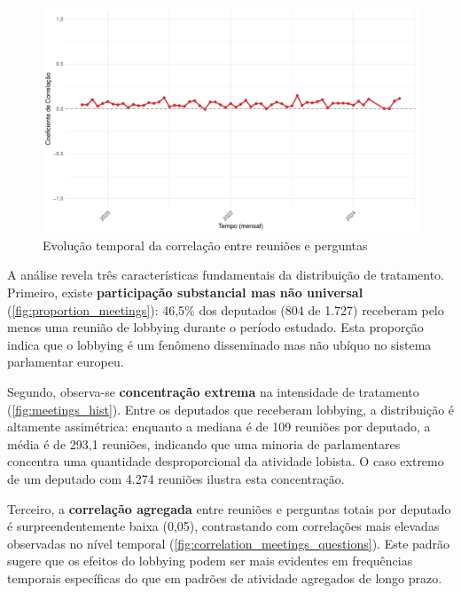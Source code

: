 \begin{figure}[htbp]
    \centering
    \includegraphics[width=\textwidth]{figures/descriptive_plots/fig3_correlation_meetings_questions.pdf}
    \caption{Evolução temporal da correlação entre reuniões e perguntas}
    \label{fig:correlation_meetings_questions}
\end{figure}


A análise revela três características fundamentais da distribuição de tratamento. Primeiro, existe \textbf{participação substancial mas não universal} (\autoref{fig:proportion_meetings}): 46,5\% dos deputados (804 de 1.727) receberam pelo menos uma reunião de lobbying durante o período estudado. Esta proporção indica que o lobbying é um fenômeno disseminado mas não ubíquo no sistema parlamentar europeu.

Segundo, observa-se \textbf{concentração extrema} na intensidade de tratamento (\autoref{fig:meetings_hist}). Entre os deputados que receberam lobbying, a distribuição é altamente assimétrica: enquanto a mediana é de 109 reuniões por deputado, a média é de 293,1 reuniões, indicando que uma minoria de parlamentares concentra uma quantidade desproporcional da atividade lobista. O caso extremo de um deputado com 4.274 reuniões ilustra esta concentração.

Terceiro, a \textbf{correlação agregada} entre reuniões e perguntas totais por deputado é surpreendentemente baixa (0,05), contrastando com correlações mais elevadas observadas no nível temporal (\autoref{fig:correlation_meetings_questions}). Este padrão sugere que os efeitos do lobbying podem ser mais evidentes em frequências temporais específicas do que em padrões de atividade agregados de longo prazo.



